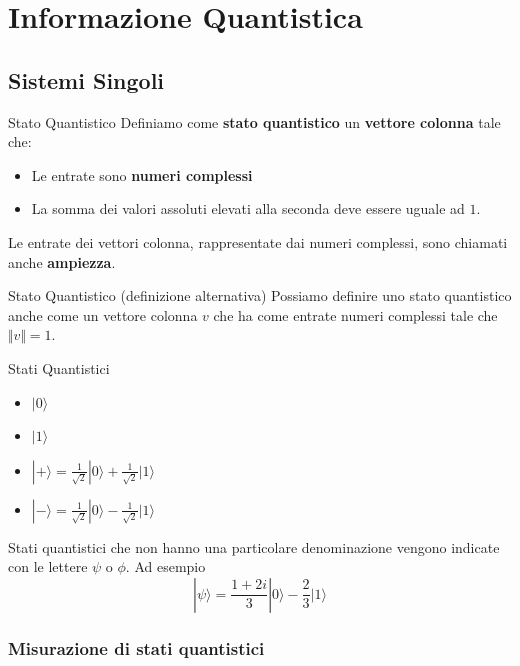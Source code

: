 \section{Informazione Quantistica}
\subsection{Sistemi Singoli}
\begin{definition}{Stato Quantistico}{}
    Definiamo come \textbf{stato quantistico} un \textbf{vettore colonna} tale che:
    \begin{itemize}
        \item Le entrate sono \textbf{numeri complessi}
        \item La somma dei valori assoluti elevati alla seconda deve essere uguale ad $1$.
    \end{itemize}
\end{definition}
Le entrate dei vettori colonna, rappresentate dai numeri complessi, sono chiamati anche \textbf{ampiezza}.
\begin{definition}{Stato Quantistico (definizione alternativa)}{}
    Possiamo definire uno stato quantistico anche come un vettore colonna $v$ che ha come entrate numeri complessi tale che $\Vert v \Vert = 1$.
\end{definition}

\begin{example}{Stati Quantistici}{}
\begin{itemize}
    \item $|0\rangle$
    \item $|1\rangle$
    \item $|+\rangle = \frac{1}{\sqrt{2}}|0\rangle +  \frac{1}{\sqrt{2}}|1\rangle$
    \item $|-\rangle = \frac{1}{\sqrt{2}}|0\rangle -  \frac{1}{\sqrt{2}}|1\rangle$
\end{itemize}
\end{example}
Stati quantistici che non hanno una particolare denominazione vengono indicate con le lettere $\psi$ o $\phi$. Ad esempio
\begin{equation*}
    |\psi\rangle = \frac{1 + 2i}{3}|0\rangle -  \frac{2}{3}|1\rangle
\end{equation*}
\subsubsection{Misurazione di stati quantistici}
